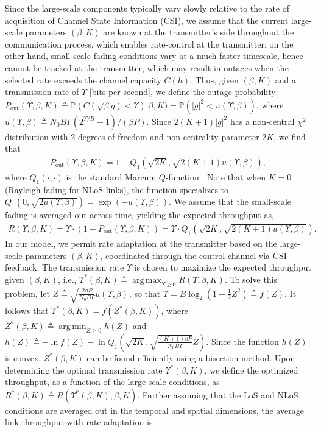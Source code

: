 \documentclass[12pt, draftcls, onecolumn]{IEEEtran}
\theoremstyle{plain}
\theoremstyle{definition}
\theoremstyle{remark}
\DeclareMathOperator*{\argmax}{arg\,max}
\DeclareMathOperator*{\argmin}{arg\,min}
\begin{document}
Since the large-scale components typically vary slowly relative to the rate of acquisition of Channel State Information (CSI), we assume that the current large-scale parameters $(\beta,K)$ are known at the transmitter's side throughout the communication process, which enables rate-control at the transmitter; on the other hand, small-scale fading conditions vary at a much faster timescale, hence cannot be tracked at the transmitter, which may result in outages when the selected rate exceeds the channel capacity $C(h)$. Thus, given $(\beta,K)$ and a transmission rate of $\Upsilon$ [bits per second], we define the outage probability $P_{\mathrm{out}}(\Upsilon,\beta,K) \triangleq \mathbb{P}(C(\sqrt{\beta}g){<}\Upsilon)|\beta,K) = \mathbb{P}\left(|g|^{2}{<}u(\Upsilon,\beta)\right)$, where $u(\Upsilon,\beta){\triangleq}N_{0}B\Gamma(2^{\Upsilon/B}{-}1)/(\beta P)$. Since $2(K{+}1)|g|^{2}$ has a non-central $\chi^2$ distribution with $2$ degrees of freedom and non-centrality parameter $2K$, we find that
\begin{align}
	P_{\mathrm{out}}(\Upsilon,\beta,K)=1-Q_{1}\left(\sqrt{2K},\sqrt{2(K+1)u(\Upsilon,\beta)}\right),
\end{align}
where $Q_{1}(\cdot,\cdot)$ is the standard Marcum $Q$-function \cite{Rician}. Note that when $K{=}0$ (Rayleigh fading for NLoS links), the function specializes to $Q_{1}\left(0,\sqrt{2u(\Upsilon,\beta)}\right){=}\exp(-u(\Upsilon,\beta))$. We assume that the small-scale fading is averaged out across time, yielding the expected throughput as,
\begin{align}
	R(\Upsilon,\beta,K)=\Upsilon\cdot\left(1-P_{\mathrm{out}}(\Upsilon,\beta,K)\right)=\Upsilon\cdot Q_{1}\left(\sqrt{2K},\sqrt{2(K+1)u(\Upsilon,\beta)}\right).
\end{align}
In our model, we permit rate adaptation at the transmitter based on the large-scale parameters $(\beta,K)$, coordinated through the control channel via CSI feedback. The transmission rate $\Upsilon$ is chosen to maximize the expected throughput given $(\beta,K)$, i.e., $\Upsilon^{*}(\beta,K){\triangleq}\argmax_{\Upsilon{\geq}0}R(\Upsilon,\beta,K).$ To solve this problem, let $Z{\triangleq}\sqrt{\frac{2{\beta}P}{N_{0}B\Gamma}u(\Upsilon,\beta)}$, so that $\Upsilon{=}B\log_{2}\left(1{+}\frac{1}{2}Z^{2}\right){\triangleq}f(Z)$. It follows that $\Upsilon^{*}(\beta,K){=}f(Z^{*}(\beta,K))$, where $Z^{*}(\beta,K)\triangleq\argmin_{Z{\geq}0}h(Z)$ and $h(Z) \triangleq -\ln f(Z) - \ln Q_{1}\left(\sqrt{2K},\sqrt{\frac{(K{+}1)\beta P}{N_{0}B\Gamma}}Z\right)$. Since the function $h(Z)$ is convex, $Z^{*}(\beta,K)$ can be found efficiently using a bisection method. Upon determining the optimal transmission rate $\Upsilon^{*}(\beta,K)$, we define the optimized throughput, as a function of the large-scale conditions, as $R^{*}(\beta,K) \triangleq R(\Upsilon^{*}(\beta,K),\beta,K)$. Further assuming that the LoS and NLoS conditions are averaged out in the temporal and spatial dimensions, the average link throughput with rate adaptation is
\end{document}
